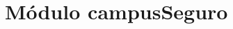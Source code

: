 \documentclass[a4paper,10pt]{article}
\begin{document}


\newpage
\section{Módulo campusSeguro}
\end{document}
